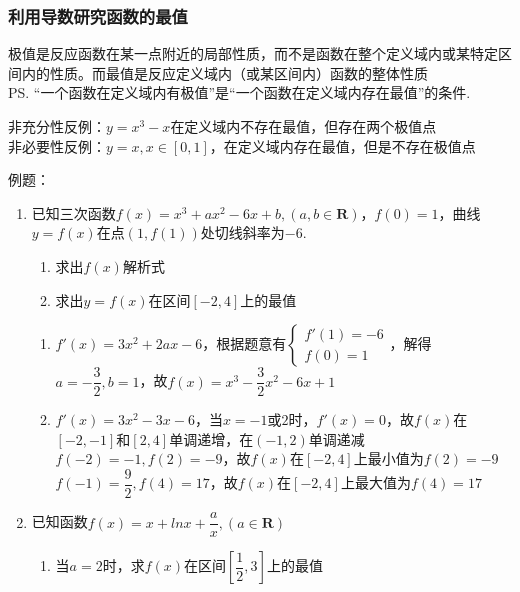 \subsubsection*{利用导数研究函数的最值}
极值是反应函数在某一点附近的局部性质，而不是函数在整个定义域内或某特定区间内的性质。而最值是反应定义域内（或某区间内）函数的整体性质 \\
\ps “一个函数在定义域内有极值”是“一个函数在定义域内存在最值”的条件.
    \begin{jieda}
        非充分性反例：$y = x^3 - x$在定义域内不存在最值，但存在两个极值点 \\
        非必要性反例：$y = x, x\in [0, 1]$，在定义域内存在最值，但是不存在极值点
    \end{jieda}
例题：
\begin{enumerate}
    \item 已知三次函数$f(x) = x^3 + ax^2-6x+b, (a, b \in \mathbf{R})$，$f(0) = 1$，曲线$y = f(x)$在点$(1, f(1))$处切线斜率为$-6$.
    \begin{enumerate}
        \item 求出$f(x)$解析式
        \item 求出$y = f(x)$在区间$[-2, 4]$上的最值
    \end{enumerate}
    \begin{jieda}
        \begin{enumerate}
            \item $f'(x) = 3x^2+2ax-6$，根据题意有$\left\{\begin{array}{l}
                 f'(1) = -6 \\
                 f(0) = 1
            \end{array}\right.$，解得$a = -\dfrac{3}{2}, b = 1$，故$f(x) = x^3 - \dfrac{3}{2}x^2-6x+1$
            \item $f'(x) = 3x^2-3x-6$，当$x = -1$或$2$时，$f'(x) = 0$，故$f(x)$在$[-2, -1]$和$[2, 4]$单调递增，在$(-1, 2)$单调递减 \\
            $f(-2) = -1, f(2) = -9$，故$f(x)$在$[-2, 4]$上最小值为$f(2) = -9$ \\
            $f(-1) = \dfrac{9}{2}, f(4) = 17$，故$f(x)$在$[-2, 4]$上最大值为$f(4) = 17$
        \end{enumerate}
    \end{jieda}
    \item 已知函数$f(x) = x  + lnx + \dfrac{a}{x}, (a\in \mathbf{R})$
    \begin{enumerate}
        \item 当$a = 2$时，求$f(x)$在区间$\left[\dfrac{1}{2}, 3\right]$上的最值

\end{enumerate}
\end{enumerate}
